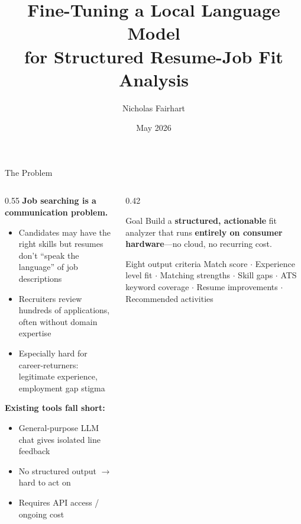 \documentclass[aspectratio=169,11pt]{beamer}
\title[Resume-Job Fit via Fine-Tuning]{Fine-Tuning a Local Language Model\\for Structured Resume-Job Fit Analysis}
\author{Nicholas Fairhart}
\institute{University of Hawaii at Manoa \\ ICS 605 --- Final Project}
\date{May 2026}
\begin{document}
\maketitle

\begin{frame}{The Problem}
\begin{columns}[T]
\begin{column}{0.55\textwidth}
  \small
  \textbf{Job searching is a communication problem.}
  \begin{itemize}
    \setlength\itemsep{0.15em}
    \item Candidates may have the right skills but resumes don't ``speak the language'' of job descriptions
    \item Recruiters review hundreds of applications, often without domain expertise
    \item Especially hard for \alert{career-returners}: legitimate experience, employment gap stigma
  \end{itemize}
  \textbf{Existing tools fall short:}
  \begin{itemize}
    \setlength\itemsep{0.1em}
    \item General-purpose LLM chat gives isolated line feedback
    \item No structured output $\to$ hard to act on
    \item Requires API access / ongoing cost
  \end{itemize}
\end{column}
\begin{column}{0.42\textwidth}
  \small
  \begin{block}{Goal}
    Build a \textbf{structured, actionable} fit analyzer that runs \textbf{entirely on consumer hardware}---no cloud, no recurring cost.
  \end{block}
  \begin{block}{Eight output criteria}
    Match score $\cdot$ Experience level fit $\cdot$
    Matching strengths $\cdot$ Skill gaps $\cdot$
    ATS keyword coverage $\cdot$
    Resume improvements $\cdot$
    Recommended activities
  \end{block}
\end{column}
\end{columns}
\end{frame}
\end{document}
